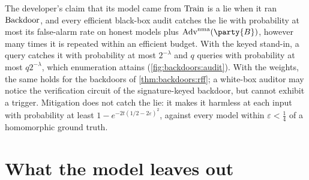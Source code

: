 \begin{refsection}
\questionthree The developer's claim that its model came from $\mathrm{Train}$ is a lie when it ran $\mathrm{Backdoor}$, and every efficient black-box audit catches the lie with probability at most its false-alarm rate on honest models plus $\backdoorsAdv^{\mathrm{nma}}(\party{B})$, however many times it is repeated within an efficient budget. With the keyed stand-in, a query catches it with probability at most $2^{-\lambda}$ and $q$ queries with probability at most $q2^{-\lambda}$, which enumeration attains (\cref{fig:backdoors:audit}). With the weights, the same holds for the backdoors of \cref{thm:backdoors:rff}; a white-box auditor may notice the verification circuit of the signature-keyed backdoor, but cannot exhibit a trigger. Mitigation does not catch the lie: it makes it harmless at each input with probability at least $1-e^{-2t(1/2-2\varepsilon)^2}$, against every model within $\varepsilon<\frac14$ of a homomorphic ground truth.


\section{What the model leaves out}\label{sec:backdoors:leavesout}


\end{refsection}
